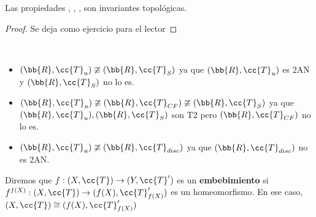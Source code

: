 \begin{prop}
    Las propiedades , , ,  son invariantes topológicas.
    \begin{proof}
        Se deja como ejercicio para el lector %
    \end{proof}
\end{prop}

\begin{ejemplo}\
    \begin{itemize}
        \item $(\bb{R}, \cc{T}_u)\ncong (\bb{R}, \cc{T}_S)$ ya que $(\bb{R}, \cc{T}_u)$ es 2AN y $(\bb{R}, \cc{T}_S)$ no lo es.
        \item $(\bb{R}, \cc{T}_u)\ncong (\bb{R}, \cc{T}_{CF})\ncong (\bb{R}, \cc{T}_S)$ ya que $(\bb{R}, \cc{T}_u), (\bb{R}, \cc{T}_S)$ son T2 pero $(\bb{R}, \cc{T}_{CF})$ no lo es.
        \item $(\bb{R}, \cc{T}_u)\ncong (\bb{R}, \cc{T}_{disc})$ ya que $(\bb{R}, \cc{T}_{disc})$ no es 2AN.
    \end{itemize}
    \endsquare
\end{ejemplo}

\begin{definicion}
    Diremos que $f:(X, \cc{T})\to (Y, \cc{T}')$ es un \textbf{embebimiento} si $f^{f(X)}:(X, \cc{T})\to (f(X), \cc{T}_{f(X)}')$ es un homeomorfismo.
    En ese caso, $(X, \cc{T})\cong(f(X), \cc{T}_{f(X)}')$
    \endsquare
\end{definicion}

